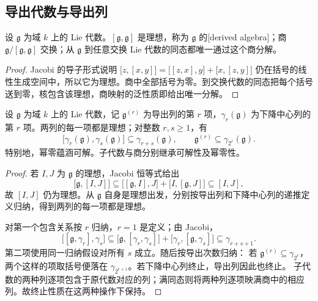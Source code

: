\subsection{导出代数与导出列}
\label{b5:subsec:1104:02}

\begin{proposition}\label{b5:prop:lie-derived-ideal}
	设 \(\mathfrak g\) 为域 \(k\) 上的 Lie 代数。\([\mathfrak g,\mathfrak g]\) 是理想，称为 \(\mathfrak g\) 的[derived algebra]；商 \(\mathfrak g/[\mathfrak g,\mathfrak g]\) 交换；从 \(\mathfrak g\) 到任意交换 Lie 代数的同态都唯一通过这个商分解。
\end{proposition}
\begin{proof}
	Jacobi 的导子形式说明 \(\bigl[z,[x,y]\bigr]=\bigl[[z,x],y\bigr]+\bigl[x,[z,y]\bigr]\) 仍在括号的线性生成空间中，所以它为理想。商中全部括号为零。到交换代数的同态把每个括号送到零，核包含该理想，商映射的泛性质即给出唯一分解。
\end{proof}
\begin{proposition}\label{b5:prop:lie-series-properties}
	设 \(\mathfrak g\) 为域 \(k\) 上的 Lie 代数，记 \(\mathfrak g^{(r)}\) 为导出列的第 \(r\) 项，\(\gamma_r(\mathfrak g)\) 为下降中心列的第 \(r\) 项。两列的每一项都是理想；对整数 \(r,s\ge1\)，有
	\[
		\bigl[\gamma_r(\mathfrak g),\gamma_s(\mathfrak g)\bigr] \subseteq\gamma_{r+s}(\mathfrak g),\qquad \mathfrak g^{(r)}\subseteq\gamma_{2^r}(\mathfrak g).
	\]
	特别地，幂零蕴涵可解。子代数与商分别继承可解性及幂零性。
\end{proposition}
\begin{proof}
	若 \(I,J\) 为 \(\mathfrak g\) 的理想，Jacobi 恒等式给出
	\[
		\bigl[\mathfrak g,[I,J]\bigr] \subseteq\bigl[[\mathfrak g,I],J\bigr]+\bigl[I,[\mathfrak g,J]\bigr] \subseteq[I,J],
	\]
	故 \([I,J]\) 仍为理想。从 \(\mathfrak g\) 自身是理想出发，分别按导出列和下降中心列的递推定义归纳，得到两列的每一项都是理想。

	对第一个包含关系按 \(r\) 归纳，\(r=1\) 是定义；由 Jacobi，
	\[
		\bigl[[\mathfrak g,\gamma_r],\gamma_s\bigr] \subseteq\bigl[\mathfrak g,[\gamma_r,\gamma_s]\bigr] +\bigl[\gamma_r,[\mathfrak g,\gamma_s]\bigr] \subseteq\gamma_{r+s+1}.
	\]
	第二项使用同一归纳假设对所有 \(s\) 成立。随后按导出次数归纳： 若 \(\mathfrak g^{(r)}\subseteq\gamma_{2^r}\)，两个这样的项取括号便落在 \(\gamma_{2^{r+1}}\)。若下降中心列终止，导出列因此也终止。 子代数的两种列逐项包含于原代数对应的列；满同态则将两种列逐项映满商中的相应列。故终止性质在这两种操作下保持。
\end{proof}
